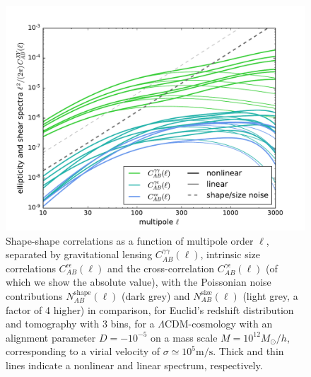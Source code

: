 \documentclass[a4paper,fleqn,usenatbib]{mnras}
\begin{document}
\begin{figure}
\centering
\includegraphics[scale=0.45]{./figures/ia_spectrum.pdf}
\caption{Shape-shape correlations as a function of multipole order $\ell$, separated by gravitational lensing $C_{AB}^{\gamma\gamma}(\ell)$, intrinsic size correlations $C_{AB}^{\epsilon\epsilon}(\ell)$ and the cross-correlation $C_{AB}^{\gamma\epsilon}(\ell)$ (of which we show the absolute value), with the Poissonian noise contributions $N_{AB}^\mathrm{shape}(\ell)$ (dark grey) and $N_{AB}^\mathrm{size}(\ell)$ (light grey, a factor of 4 higher) in comparison, for Euclid's redshift distribution and tomography with 3 bins, for a $\Lambda$CDM-cosmology with an alignment parameter $D=-10^{-5}$ on a mass scale $M = 10^{12}M_\odot/h$, corresponding to a virial velocity of $\sigma\simeq10^5\mathrm{m}/\mathrm{s}$. Thick and thin lines indicate a nonlinear and linear spectrum, respectively.}
\label{fig:shapeshape}
\end{figure}
\end{document}
